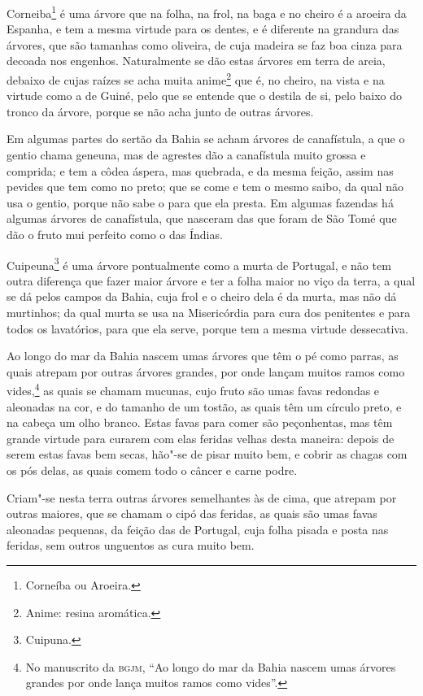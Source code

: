 Corneiba\footnote{ Corneíba ou Aroeira.} é uma árvore que na folha, na frol, na baga e no
cheiro é a aroeira da Espanha, e tem a mesma virtude para os dentes, e é diferente na
grandura das árvores, que são tamanhas como oliveira, de cuja madeira se faz boa cinza
para decoada nos engenhos. Naturalmente se dão estas árvores em terra de areia, debaixo de
cujas raízes se acha muita anime\footnote{ Anime: resina aromática.} que é, no cheiro, na
vista e na virtude como a de Guiné, pelo que se entende que o destila de si, pelo baixo do
tronco da árvore, porque se não acha junto de outras árvores.

Em algumas partes do sertão da Bahia se acham árvores de canafístula, a que o gentio chama
geneuna, mas de agrestes dão a canafístula muito grossa e comprida; e tem a côdea áspera,
mas quebrada, e da mesma feição, assim nas pevides que tem como no preto; que se come e
tem o mesmo saibo, da qual não usa o gentio, porque não sabe o para que ela presta. Em
algumas fazendas há algumas árvores de canafístula, que nasceram das que foram de São Tomé
que dão o fruto mui perfeito como o das Índias.

Cuipeuna\footnote{ Cuipuna.} é uma árvore pontualmente como a murta de Portugal, e não tem
outra diferença que fazer maior árvore e ter a folha maior no viço da terra, a qual se dá
pelos campos da Bahia, cuja frol e o cheiro dela é da murta, mas não dá murtinhos; da qual
murta se usa na Misericórdia para cura dos penitentes e para todos os lavatórios, para que
ela serve, porque tem a mesma virtude dessecativa.

Ao longo do mar da Bahia nascem umas árvores que têm o pé como parras, as quais atrepam
por outras árvores grandes, por onde lançam muitos ramos como vides,\footnote{ No
manuscrito da \textsc{bgjm}, ``Ao longo do mar da Bahia nascem umas árvores grandes por
onde lança muitos ramos como vides''.} as quais se chamam mucunas, cujo fruto são umas
favas redondas e aleonadas na cor, e do tamanho de um tostão, as quais têm um círculo
preto, e na cabeça um olho branco. Estas favas para comer são peçonhentas, mas têm grande
virtude para curarem com elas feridas velhas desta maneira: depois de serem estas favas
bem secas, hão"-se de pisar muito bem, e cobrir as chagas com os pós delas, as quais comem
todo o câncer e carne podre.

Criam"-se nesta terra outras árvores semelhantes às de cima, que atrepam por outras
maiores, que se chamam o cipó das feridas, as quais são umas favas aleonadas pequenas, da
feição das de Portugal, cuja folha pisada e posta nas feridas, sem outros unguentos as
cura muito bem.


